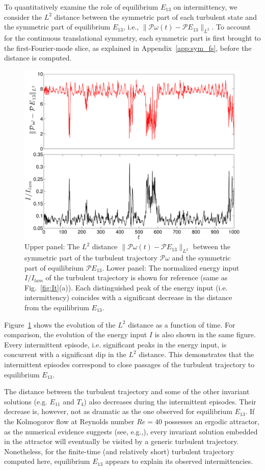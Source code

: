 \documentclass{jfm}
\begin{document}
To quantitatively examine the role of equilibrium $E_{13}$ on intermittency, we consider the $L^2$
distance between the symmetric part of each turbulent state and
the symmetric part of equilibrium $E_{13}$, i.e.,
$\|\mathcal P\omega (t)-\mathcal PE_{13}\|_{L^2}$.
To account for the continuous translational symmetry, each symmetric
part is first brought to the first-Fourier-mode slice,
as explained in Appendix~\ref{app:sym_fs}, before the distance is computed.
%
\begin{figure}
\centering
\includegraphics[width=.75\textwidth]{R40_distFromE13_02}
\caption{Upper panel: The $L^2$ distance $\|\mathcal P\omega(t)-\mathcal PE_{13}\|_{L^2}$
between the symmetric part of the turbulent trajectory $\mathcal{P}\omega$
and the symmetric part of equilibrium $\mathcal PE_{13}$.
Lower panel: The normalized
energy input $I/I_{lam}$  of the turbulent
trajectory is shown for reference (same as Fig.~\ref{fig:It}(a)).
Each distinguished peak of the energy input (i.e. intermittency) coincides with a significant
decrease in the distance from the equilibrium $E_{13}$.}
\label{fig:distE13}
\end{figure}

Figure~\ref{fig:distE13} shows the evolution of the $L^2$ distance
as a function of time. For comparison, the evolution of the energy input $I$ is
also shown in the same figure. Every intermittent episode, i.e. significant peaks
in the energy input, is concurrent with a significant dip in the $L^2$ distance.
This demonstrates that the intermittent episodes correspond to
close passages of the turbulent trajectory to equilibrium $E_{13}$.

The distance between the turbulent trajectory and some of the other invariant
solutions (e.g. $E_{11}$ and $T_4$) also decreases during the intermittent episodes.
Their decrease is, however, not as dramatic as the one observed for equilibrium $E_{13}$.
If the Kolmogorov flow at Reynolds number $Re=40$ possesses an ergodic attractor,
as the numerical evidence suggests (see, e.g.,),
every invariant solution embedded in the attractor will
eventually be visited by a generic turbulent trajectory.
Nonetheless, for the finite-time (and relatively short)
turbulent trajectory computed here, equilibrium $E_{13}$ appears to explain its
observed intermittencies.
\end{document}
